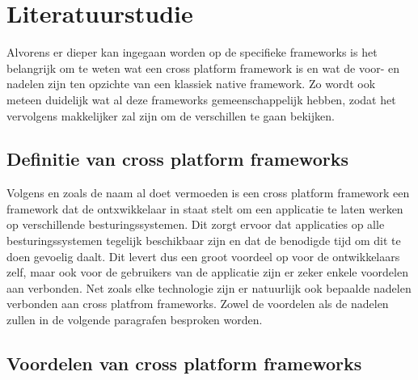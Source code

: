 \section{Literatuurstudie}
\label{sec:literatuurstudie}

Alvorens er dieper kan ingegaan worden op de specifieke frameworks is het belangrijk om te weten wat een cross platform framework is en wat de voor- en nadelen zijn ten opzichte van een klassiek native framework. Zo wordt ook meteen duidelijk wat al deze frameworks gemeenschappelijk hebben, zodat het vervolgens makkelijker zal zijn om de verschillen te gaan bekijken.

\subsection{Definitie van cross platform frameworks}

Volgens \textcite{El-Kassas2014} en zoals de naam al doet vermoeden is een cross platform framework een framework dat de ontxwikkelaar in staat stelt om een applicatie te laten werken op verschillende besturingssystemen. Dit zorgt ervoor dat applicaties op alle besturingssystemen tegelijk beschikbaar zijn en dat de benodigde tijd om dit te doen gevoelig daalt. Dit levert dus een groot voordeel op voor de ontwikkelaars zelf, maar ook voor de gebruikers van de applicatie zijn er zeker enkele voordelen aan verbonden. Net zoals elke technologie zijn er natuurlijk ook bepaalde nadelen verbonden aan cross platfrom frameworks. Zowel de voordelen als de nadelen zullen in de volgende paragrafen besproken worden.

\subsection{Voordelen van cross platform frameworks}

